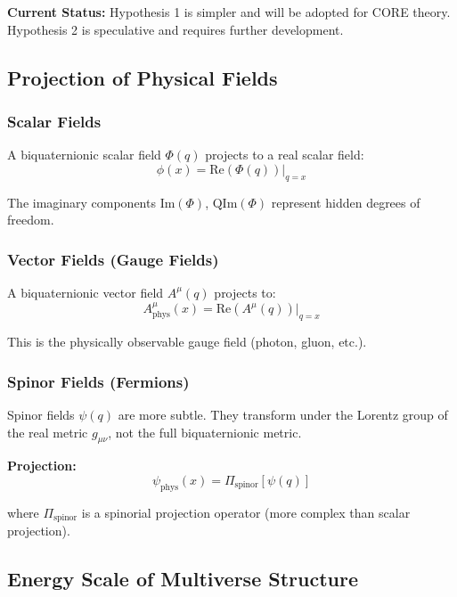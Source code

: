 \textbf{Current Status:} Hypothesis 1 is simpler and will be adopted for CORE theory. Hypothesis 2 is speculative and requires further development.

\subsection{Projection of Physical Fields}

\subsubsection{Scalar Fields}

A biquaternionic scalar field $\Phi(q)$ projects to a real scalar field:
\begin{equation}
\phi(x) = \text{Re}(\Phi(q))\Big|_{q=x}
\end{equation}

The imaginary components $\text{Im}(\Phi)$, $\text{QIm}(\Phi)$ represent hidden degrees of freedom.

\subsubsection{Vector Fields (Gauge Fields)}

A biquaternionic vector field $A^{\mu}(q)$ projects to:
\begin{equation}
A^{\mu}_{\text{phys}}(x) = \text{Re}(A^{\mu}(q))\Big|_{q=x}
\end{equation}

This is the physically observable gauge field (photon, gluon, etc.).

\subsubsection{Spinor Fields (Fermions)}

Spinor fields $\psi(q)$ are more subtle. They transform under the Lorentz group of the real metric $g_{\mu\nu}$, not the full biquaternionic metric.

\textbf{Projection:}
\begin{equation}
\psi_{\text{phys}}(x) = \Pi_{\text{spinor}}[\psi(q)]
\end{equation}

where $\Pi_{\text{spinor}}$ is a spinorial projection operator (more complex than scalar projection).

\subsection{Energy Scale of Multiverse Structure}

